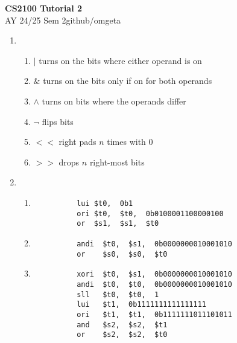 \documentclass[12pt, a4paper]{article}
\newcommand{\mytitle}{CS2100 Tutorial 2}
\newcommand{\myauthor}{github/omgeta}
\newcommand{\mydate}{AY 24/25 Sem 2}
\begin{document}
\raggedright
\footnotesize
\begin{center}
{\normalsize{\textbf{\mytitle}}} \\
{\footnotesize{\mydate\hspace{2pt}\textemdash\hspace{2pt}\myauthor}}
\end{center}
\begin{enumerate}[Q\arabic*.]
  \item 
    \begin{enumerate}[\alph*.]
      \item $|$ turns on the bits where either operand is on
      \item $\&$ turns on the bits only if on for both operands
      \item $\land$ turns on bits where the operands differ
      \item $\neg$ flips bits
      \item $<<$ right pads $n$ times with 0
      \item $>>$ drops $n$ right-most bits
    \end{enumerate}

  \item \hfill 
    \begin{enumerate}[\alph*.]
      \item 
        \begin{lstlisting}
          lui $t0,  0b1
          ori $t0,  $t0,  0b0100001100000100
          or  $s1,  $s1,  $t0
        \end{lstlisting}
      \hfill
      \item 
        \begin{lstlisting}
          andi  $t0,  $s1,  0b0000000010001010
          or    $s0,  $s0,  $t0  
        \end{lstlisting}
        \hfill
      \item 
        \begin{lstlisting}
          xori  $t0,  $s1,  0b0000000010001010
          andi  $t0,  $t0,  0b0000000010001010
          sll   $t0,  $t0,  1
          lui   $t1,  0b1111111111111111
          ori   $t1,  $t1,  0b1111111011101011
          and   $s2,  $s2,  $t1
          or    $s2,  $s2,  $t0
        \end{lstlisting}
    \end{enumerate}


\end{enumerate}
\end{document}
